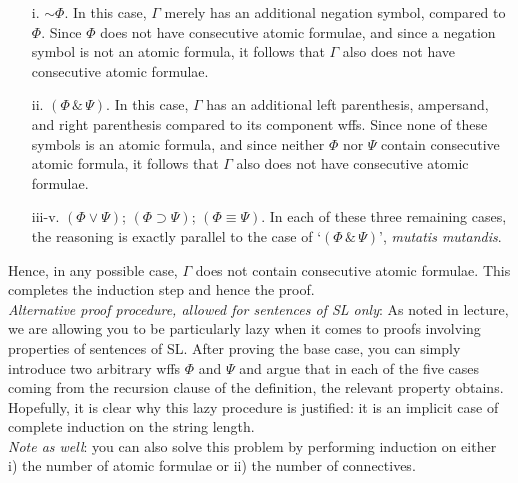 \documentclass[12pt]{article}
\def\eor{\ensuremath{\vee}}
\def\eand{\ensuremath{\,\&\,}}
\def\eif{\ensuremath{\supset}}
\def\eiff{\ensuremath{\equiv}}
\def\enot{\ensuremath{{\sim}}} %
\let\oldsim\sim %
\renewcommand{\sim}{{\oldsim}} %
\begin{document}
\begin{enumerate}
\begin{enumerate}

\item[i.] \enot $\Phi$. In this case, $\Gamma$ merely has an additional negation symbol, compared to $\Phi$. Since $\Phi$ does not have consecutive atomic formulae, and since a negation symbol is not an atomic formula, it follows that $\Gamma$ also does not have consecutive atomic formulae.

\item[ii.] $(\Phi \eand \Psi)$. In this case, $\Gamma$ has an additional left parenthesis, ampersand, and right parenthesis compared to its component wffs. Since none of these symbols is an atomic formula, and since neither $\Phi$ nor $\Psi$ contain consecutive atomic formula, it follows that $\Gamma$ also does not have consecutive atomic formulae. 

\item[iii-v.] $(\Phi \eor \Psi)$; $(\Phi \eif \Psi)$; $(\Phi \eiff \Psi)$. In each of these three remaining cases, the reasoning is exactly parallel to the case of `$(\Phi \eand \Psi)$',  \textit{mutatis mutandis}.

\end{enumerate}

Hence, in any possible case, $\Gamma$ does not contain consecutive atomic formulae. This completes the induction step and hence the proof. \\

 \textit{Alternative proof procedure, allowed for sentences of SL only}: As noted in lecture, we are allowing you to be particularly lazy when it comes to proofs involving properties of sentences of SL. After proving the base case, you can simply introduce two arbitrary wffs $\Phi$ and $\Psi$ and argue that in each of the five cases coming from the recursion clause of the definition, the relevant property obtains. Hopefully, it is clear why this lazy procedure is justified: it is an implicit case of complete induction on the string length. \\

 \textit{Note as well}: you can also solve this problem by performing induction on either \\ i) the number of atomic formulae or ii) the number of connectives. 













\end{enumerate}
\end{document}
